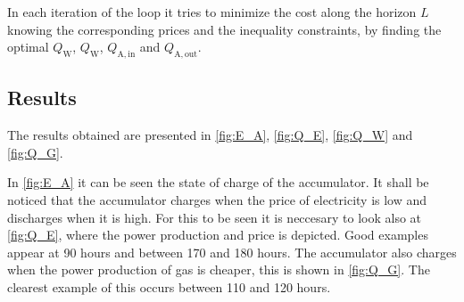In each iteration of the loop it tries to minimize the cost along the horizon $L$ knowing the corresponding prices and the inequality constraints, by finding the optimal $Q_\mathrm{W}$, $Q_\mathrm{W}$, $Q_\mathrm{A,in}$ and $Q_\mathrm{A,out}$.

\subsection*{Results}
The results obtained are presented in \autoref{fig:E_A}, \ref{fig:Q_E}, \ref{fig:Q_W} and \ref{fig:Q_G}.

In \autoref{fig:E_A} it can be seen the state of charge of the accumulator. It shall be noticed that the accumulator charges when the price of electricity is low and discharges when it is high. For this to be seen it is neccesary to look also at \autoref{fig:Q_E}, where the power production and price is depicted. Good examples appear at 90 hours and between 170 and 180 hours. The accumulator also charges when the power production of gas is cheaper, this is shown in \autoref{fig:Q_G}. The clearest example of this occurs between 110 and 120 hours.

